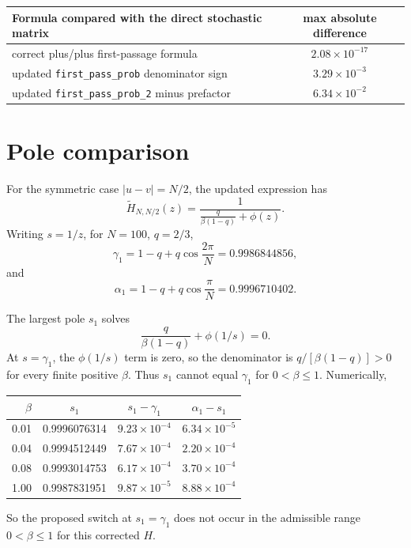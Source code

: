\documentclass[11pt]{article}
\begin{document}
\begin{center}
\begin{tabular}{lc}
\toprule
Formula compared with the direct stochastic matrix & max absolute difference \\
\midrule
correct plus/plus first-passage formula & \(2.08\times 10^{-17}\) \\
updated \texttt{first\_pass\_prob} denominator sign & \(3.29\times 10^{-3}\) \\
updated \texttt{first\_pass\_prob\_2} minus prefactor & \(6.34\times 10^{-2}\) \\
\bottomrule
\end{tabular}
\end{center}

\section*{Pole comparison}

For the symmetric case \(|u-v|=N/2\), the updated expression has
\[
  \widetilde H_{N,N/2}(z)
  =
  \frac{1}{\frac{q}{\beta(1-q)}+\phi(z)}.
\]
Writing \(s=1/z\), for \(N=100\), \(q=2/3\),
\[
  \gamma_1 = 1-q+q\cos\frac{2\pi}{N}=0.9986844856,
\]
and
\[
  \alpha_1 = 1-q+q\cos\frac{\pi}{N}=0.9996710402.
\]

The largest pole \(s_1\) solves
\[
  \frac{q}{\beta(1-q)}+\phi(1/s)=0.
\]
At \(s=\gamma_1\), the \(\phi(1/s)\) term is zero, so the denominator is
\(q/[\beta(1-q)]>0\) for every finite positive \(\beta\). Thus \(s_1\) cannot
equal \(\gamma_1\) for \(0<\beta\leq 1\). Numerically,

\begin{center}
\begin{tabular}{rccc}
\toprule
\(\beta\) & \(s_1\) & \(s_1-\gamma_1\) & \(\alpha_1-s_1\) \\
\midrule
0.01 & 0.9996076314 & \(9.23\times 10^{-4}\) & \(6.34\times 10^{-5}\) \\
0.04 & 0.9994512449 & \(7.67\times 10^{-4}\) & \(2.20\times 10^{-4}\) \\
0.08 & 0.9993014753 & \(6.17\times 10^{-4}\) & \(3.70\times 10^{-4}\) \\
1.00 & 0.9987831951 & \(9.87\times 10^{-5}\) & \(8.88\times 10^{-4}\) \\
\bottomrule
\end{tabular}
\end{center}

So the proposed switch at \(s_1=\gamma_1\) does not occur in the admissible
range \(0<\beta\leq 1\) for this corrected \(H\).
\end{document}
